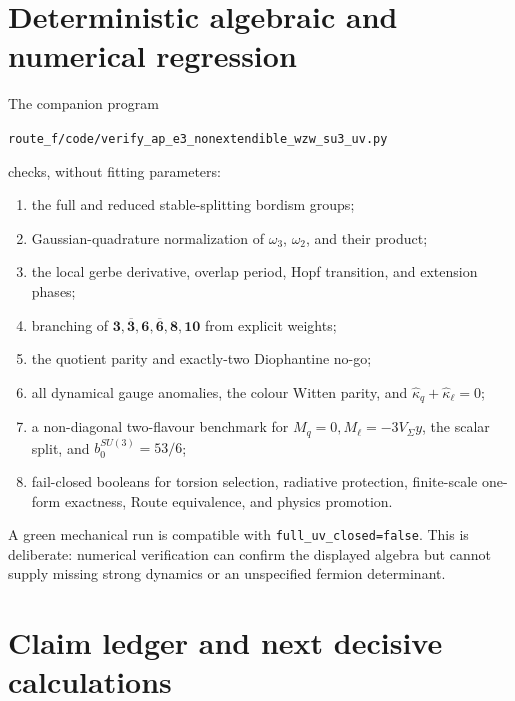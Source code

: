 \documentclass[11pt]{article}
\theoremstyle{definition}
\theoremstyle{remark}
\begin{document}
\section{Deterministic algebraic and numerical regression}

The companion program
\begin{center}
\texttt{route\_f/code/verify\_ap\_e3\_nonextendible\_wzw\_su3\_uv.py}
\end{center}
checks, without fitting parameters:
\begin{enumerate}
\item the full and reduced stable-splitting bordism groups;
\item Gaussian-quadrature normalization of \(\omega_3\), \(\omega_2\), and
  their product;
\item the local gerbe derivative, overlap period, Hopf transition, and
  extension phases;
\item branching of
  \(\bm3,\overline{\bm3},\bm6,\overline{\bm6},\bm8,\bm{10}\)
  from explicit weights;
\item the quotient parity and exactly-two Diophantine no-go;
\item all dynamical gauge anomalies, the colour Witten parity, and
  \(\widehat\kappa_q+\widehat\kappa_\ell=0\);
\item a non-diagonal two-flavour benchmark for
  \(M_q=0,M_\ell=-3V_\Sigma y\), the scalar split, and
  \(b_0^{SU(3)}=53/6\);
\item fail-closed booleans for torsion selection, radiative protection,
  finite-scale one-form exactness, Route equivalence, and physics promotion.
\end{enumerate}

A green mechanical run is compatible with
\texttt{full\_uv\_closed=false}.  This is deliberate: numerical verification
can confirm the displayed algebra but cannot supply missing strong dynamics
or an unspecified fermion determinant.

\section{Claim ledger and next decisive calculations}
\end{document}
